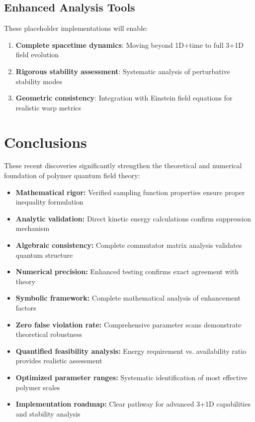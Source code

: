 \documentclass[11pt]{article}
\begin{document}
\subsection{Enhanced Analysis Tools}
These placeholder implementations will enable:
\begin{enumerate}
\item \textbf{Complete spacetime dynamics}: Moving beyond 1D+time to full 3+1D field evolution
\item \textbf{Rigorous stability assessment}: Systematic analysis of perturbative stability modes
\item \textbf{Geometric consistency}: Integration with Einstein field equations for realistic warp metrics
\end{enumerate}

\section{Conclusions}

These recent discoveries significantly strengthen the theoretical and numerical foundation of polymer quantum field theory:

\begin{itemize}
\item \textbf{Mathematical rigor:} Verified sampling function properties ensure proper inequality formulation
\item \textbf{Analytic validation:} Direct kinetic energy calculations confirm suppression mechanism
\item \textbf{Algebraic consistency:} Complete commutator matrix analysis validates quantum structure
\item \textbf{Numerical precision:} Enhanced testing confirms exact agreement with theory
\item \textbf{Symbolic framework:} Complete mathematical analysis of enhancement factors
\item \textbf{Zero false violation rate:} Comprehensive parameter scans demonstrate theoretical robustness
\item \textbf{Quantified feasibility analysis:} Energy requirement vs. availability ratio provides realistic assessment
\item \textbf{Optimized parameter ranges:} Systematic identification of most effective polymer scales
\item \textbf{Implementation roadmap:} Clear pathway for advanced 3+1D capabilities and stability analysis
\end{itemize}
\end{document}
